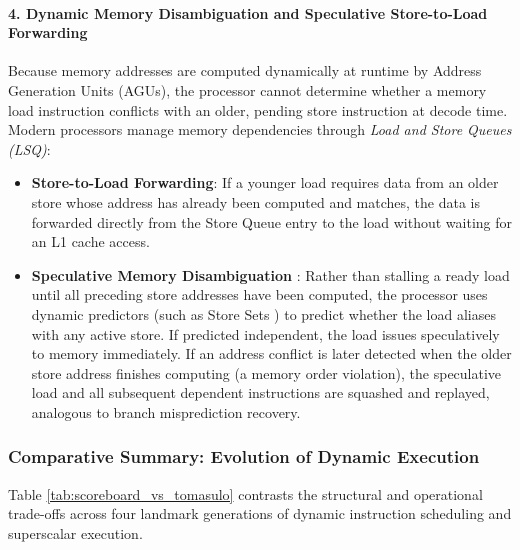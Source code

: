 \paragraph{4. Dynamic Memory Disambiguation and Speculative Store-to-Load Forwarding}
Because memory addresses are computed dynamically at runtime by Address Generation Units (AGUs), the processor cannot determine whether a memory load instruction conflicts with an older, pending store instruction at decode time. Modern processors manage memory dependencies through \textit{Load and Store Queues (LSQ)}:
\begin{itemize}
    \item \textbf{Store-to-Load Forwarding}: If a younger load requires data from an older store whose address has already been computed and matches, the data is forwarded directly from the Store Queue entry to the load without waiting for an L1 cache access.
    
    \item \textbf{Speculative Memory Disambiguation} \cite{moshovos1997dynamic, chrysos1998memory}: Rather than stalling a ready load until all preceding store addresses have been computed, the processor uses dynamic predictors (such as Store Sets \cite{chrysos1998memory}) to predict whether the load aliases with any active store. If predicted independent, the load issues speculatively to memory immediately. If an address conflict is later detected when the older store address finishes computing (a memory order violation), the speculative load and all subsequent dependent instructions are squashed and replayed, analogous to branch misprediction recovery.
\end{itemize}

\subsubsection{Comparative Summary: Evolution of Dynamic Execution}\label{sec:ooo_comparison}

Table \ref{tab:scoreboard_vs_tomasulo} contrasts the structural and operational trade-offs across four landmark generations of dynamic instruction scheduling and superscalar execution.

